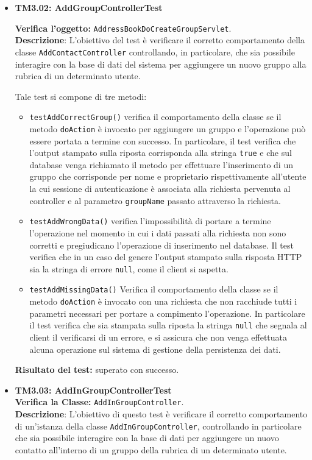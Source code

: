 \begin{itemize}
\item \textbf{TM3.02: AddGroupControllerTest}

\textbf{Verifica l'oggetto:} \texttt{AddressBookDoCreateGroupServlet}.\\
\textbf{Descrizione}: L'obiettivo del test è verificare il corretto comportamento della classe \texttt{AddContactController} controllando, in particolare, che sia possibile interagire con la base di dati del sistema per aggiungere un nuovo gruppo alla rubrica di un determinato utente.

Tale test si compone di tre metodi:
\begin{itemize}
\item \texttt{testAddCorrectGroup()} verifica il comportamento della classe se il metodo \texttt{doAction} è invocato per aggiungere un gruppo e l'operazione può essere portata a termine con successo. In particolare, il test verifica che l'output stampato sulla riposta corrisponda alla stringa \texttt{true} e che sul database venga richiamato il metodo per effettuare l'inserimento di un gruppo che corrisponde per nome e proprietario rispettivamente all'utente la cui sessione di autenticazione è associata alla richiesta pervenuta al controller e al parametro \texttt{groupName} passato attraverso la richiesta.

\item \texttt{testAddWrongData()} verifica l'impossibilità di portare a termine l'operazione nel momento in cui i dati passati alla richiesta non sono corretti e pregiudicano l'operazione di inserimento nel database. Il test verifica che in un caso del genere l'output stampato sulla risposta HTTP sia la stringa di errore \texttt{null}, come il client si aspetta.

\item \texttt{testAddMissingData()} Verifica il comportamento della classe se il metodo \texttt{doAction} è invocato con una richiesta che non racchiude tutti i parametri necessari per portare a compimento l'operazione. In particolare il test verifica che sia stampata sulla riposta la stringa \texttt{null} che segnala al client il verificarsi di un errore, e si assicura che non venga effettuata alcuna operazione sul sistema di gestione della persistenza dei dati.
\end{itemize}
\textbf{Risultato del test:} superato con successo.

\item \textbf{TM3.03: AddInGroupControllerTest}\\
\textbf{Verifica la Classe:} \texttt{AddInGroupController}.\\
\textbf{Descrizione}: L'obiettivo di questo test è verificare il corretto comportamento di un'istanza della classe \texttt{AddInGroupController}, controllando in particolare che sia possibile interagire con la base di dati per aggiungere un nuovo contatto all'interno di un gruppo della rubrica di un determinato utente.


\end{itemize}
